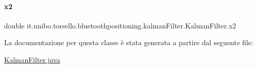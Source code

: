 \paragraph{\texorpdfstring{x2}{x2}}
{\footnotesize\ttfamily double it.\+unibo.\+torsello.\+bluetoothpositioning.\+kalman\+Filter.\+Kalman\+Filter.\+x2\hspace{0.3cm}{\ttfamily [private]}}



La documentazione per questa classe è stata generata a partire dal seguente file\+:\begin{DoxyCompactItemize}
\item 
\hyperlink{KalmanFilter_8java}{Kalman\+Filter.\+java}\end{DoxyCompactItemize}
